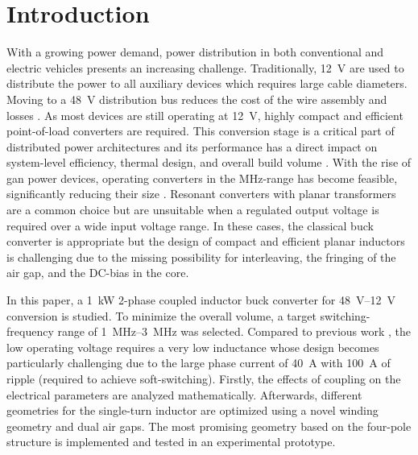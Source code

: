 \documentclass{IPEC2026}
\newcommand{\ac}{\gls}
\begin{document}
\section{Introduction}
With a growing power demand, power distribution in both conventional and electric vehicles presents an increasing challenge. Traditionally, \qty{12}{\V} are used to distribute the power to all auxiliary devices which requires large cable diameters. Moving to a \qty{48}{\V} distribution bus reduces the cost of the wire assembly and losses \cite{kumawatComprehensiveStudyAutomotive2019}. As most devices are still operating at \qty{12}{\V}, highly compact and efficient point-of-load converters are required. This conversion stage is a critical part of distributed power architectures and its performance has a direct impact on system-level efficiency, thermal design, and overall build volume \cite{kumawatComprehensiveStudyAutomotive2019}. With the rise of \ac{gan} power devices, operating converters in the MHz-range has become feasible, significantly reducing their size \cite{weitzHighFrequencyResonant2023}. Resonant converters with planar transformers are a common choice but are unsuitable when a regulated output voltage is required over a wide input voltage range. In these cases, the classical buck converter is appropriate but the design of compact and efficient planar inductors is challenging due to the missing possibility for interleaving, the fringing of the air gap, and the DC-bias in the core. \par
In this paper, a \qty{1}{\kW} 2-phase coupled inductor buck converter for \qtyrange{48}{12}{\V} conversion is studied. To minimize the overall volume, a target switching-frequency range of \qtyrange{1}{3}{\MHz} was selected. Compared to previous work \cite{nan1MHzBidirectional2016, dongInvestigationMultiphaseCoupledInductor2009, shaZVSInterleavedSynchronousBuck2022, huaUltrathinCoupledInductor2021, wangPCBWindingBasedCoupled2023}, the low operating voltage requires a very low inductance whose design becomes particularly challenging due to the large phase current of \qty{40}{\A} with \qty{100}{\A} of ripple (required to achieve soft-switching). Firstly, the effects of coupling on the electrical parameters are analyzed mathematically. Afterwards, different geometries for the single-turn inductor are optimized using a novel winding geometry and dual air gaps. The most promising geometry based on the four-pole structure is implemented and tested in an experimental prototype. %
\end{document}
